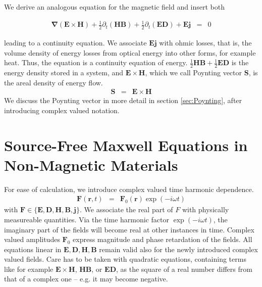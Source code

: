 \documentclass[12pt,a4paper,twoside,openright,BCOR10mm,headsepline,titlepage,abstracton,chapterprefix,final]{scrreprt}
\newcommand\Vector[1]{{\mathbf{#1}}}
\newcommand\Nabla{\Vector{\nabla}}
\newcommand\scalarEfield{E}
\newcommand\scalarBfield{B}
\newcommand\scalarHfield{H}
\newcommand\scalarDfield{D}
\newcommand\Efield{\Vector{\scalarEfield}}
\newcommand\Bfield{\Vector{\scalarBfield}}
\newcommand\Hfield{\Vector{\scalarHfield}}
\newcommand\Dfield{\Vector{\scalarDfield}}
\newcommand\currentdensity{\Vector{j}}
\begin{document}
We derive an analogous equation for the magnetic field and insert both

\begin{eqnarray}
   \Nabla ( \Efield \times \Hfield ) + \frac{1}{2} \partial_t (\Hfield \Bfield) + \frac{1}{2} \partial_t (\Efield \Dfield) + \Efield \currentdensity &=& 0
\end{eqnarray}

leading to a continuity equation. 
We associate $\Efield \currentdensity$ with ohmic losses, that is, the volume density of energy losses from optical energy into other forms, for example heat.
Thus, the equation is a continuity equation of energy.
$\frac{1}{2} \Hfield \Bfield + \frac{1}{2} \Efield \Dfield$ is the energy density stored in a system, 
and $\Efield \times \Hfield$, which we call Poynting vector $\Vector{S}$, is the areal density of energy flow.
\begin{eqnarray}
 \Vector{S} &=& \Efield \times \Hfield
 \label{eq:definitionOfPoynting}
\end{eqnarray}
We discuss the Poynting vector in more detail in section \ref{sec:Poynting}, after introducing complex valued notation.

\section{Source-Free Maxwell Equations in Non-Magnetic Materials}
\label{sec:sourcefreemaxwell}
For ease of calculation, we introduce complex valued time harmonic dependence.
\begin{eqnarray}
 \Vector{F}(\Vector{r},t) &=& \Vector{F}_0(\Vector{r}) \exp(-i \omega t)
\end{eqnarray}
with $\Vector{F} \in \{ \Efield, \Dfield, \Hfield, \Bfield, \currentdensity \}$.
We associate the real part of $F$ with physically measureable quantities. 
Via the time harmonic factor $\exp(-i \omega t)$, the imaginary part of the fields will become real at other instances in time.
Complex valued amplitudes $\Vector{F}_0$ express magnitude and phase retardation of the fields.
All equations linear in $\Efield,\Dfield,\Hfield,\Bfield$ remain valid also for the newly introduced complex valued fields.
Care has to be taken with quadratic equations, 
containing terms like for example $\Efield \times \Hfield$, $\Hfield \Bfield$, or $\Efield \Dfield$,
as the square of a real number differs from that of a complex one -- e.g. it may become negative.
\end{document}
